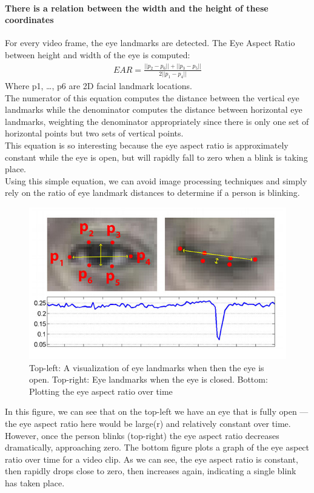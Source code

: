             \paragraph{There is a relation between the width and the height of these coordinates}
                For every video frame, the eye landmarks are detected. The Eye Aspect Ratio between height and width of the eye is computed: 
                \begin{align}
                    EAR = \frac{||p_2 - p_6|| + ||p_3 - p_5||}{2||p_1 - p_4||}
                \end{align}
                Where p1, …, p6 are 2D facial landmark locations. \\
                \vspace{3mm}
                The numerator of this equation computes the distance between the vertical eye landmarks while the denominator computes the distance between horizontal eye landmarks, weighting the denominator 
                appropriately since there is only one set of horizontal points but two sets of vertical points. \\ 
                \vspace{3mm}
                This equation is so interesting because the eye aspect ratio is approximately constant while the eye is open, but will rapidly fall to zero when a blink is taking place. \\ 
                \vspace{3mm}
                Using this simple equation, we can avoid image processing techniques and simply rely on the ratio of eye landmark distances to determine if a person is blinking.
                \begin{figure}[H]
                    \centering
                    \includegraphics[width=0.6\linewidth]{img/visualization.png}
                    \caption{Top-left: A visualization of eye landmarks when then the eye is open. Top-right: Eye landmarks when the eye is closed. Bottom: Plotting the eye aspect ratio over time}
                \end{figure}
                In this figure, we can see that on the top-left we have an eye that is fully open — the eye aspect ratio here would be large(r) and relatively constant over time. However, once the person blinks 
                (top-right) the eye aspect ratio decreases dramatically, approaching zero. The bottom figure plots a graph of the eye aspect ratio over time for a video clip. As we can see, the eye aspect ratio 
                is constant, then rapidly drops close to zero, then increases again, indicating a single blink has taken place.

